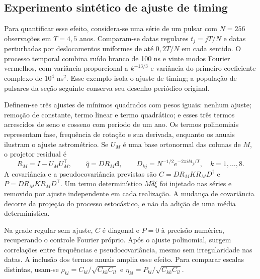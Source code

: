 \subsection{Experimento sintético de ajuste de timing}
\label{sec:timing-sintetico}

Para quantificar esse efeito, considera-se uma série de um pulsar com
$N=256$ observações em $T=4,5$ anos. Comparam-se datas regulares
$t_j=jT/N$ e datas perturbadas por deslocamentos uniformes de até
$0,2T/N$ em cada sentido. O processo temporal combina ruído branco de
100 ns e vinte modos Fourier vermelhos, com variância proporcional a
$k^{-13/3}$ e variância do primeiro coeficiente complexo de
$10^4$ ns$^2$. Esse exemplo isola o ajuste de timing; a população de
pulsares da seção seguinte conserva seu desenho periódico original.

Definem-se três ajustes de mínimos quadrados com pesos iguais: nenhum
ajuste; remoção de constante, termo linear e termo quadrático; e esses
três termos acrescidos de seno e cosseno com período de um ano. Os
termos polinomiais representam fase, frequência de rotação e sua
derivada, enquanto os anuais ilustram o ajuste astrométrico. Se $U_M$
é uma base ortonormal das colunas de $M$, o projetor residual é
\begin{equation}
 R_M=I-U_MU_M^{\mathsf T},\qquad
 \widehat q=D R_M\boldsymbol d,
 \qquad D_{kj}=N^{-1/2}e^{-2\pi i k t_j/T},\quad k=1,\ldots,8.
\end{equation}
A covariância e a pseudocovariância previstas são
$C=D R_M K R_M D^\dagger$ e $P=D R_M K R_M D^{\mathsf T}$.
Um termo determinístico $M\delta\xi$ foi injetado nas séries e removido
por ajuste independente em cada realização. A mudança de covariância
decorre da projeção do processo estocástico, e não da adição de uma
média determinística.

Na grade regular sem ajuste, $C$ é diagonal e $P=0$ à precisão
numérica, recuperando o controle Fourier próprio. Após o ajuste
polinomial, surgem correlações entre frequências e pseudocovariância,
mesmo sem irregularidade nas datas. A inclusão dos termos anuais
amplia esse efeito. Para comparar escalas distintas, usam-se
$\rho_{kl}=C_{kl}/\sqrt{C_{kk}C_{ll}}$ e
$\eta_{kl}=P_{kl}/\sqrt{C_{kk}C_{ll}}$.

\begin{table}[htbp]
\centering
\caption{Dependência entre os oito canais Fourier após o ajuste de
timing. A KL compara a distribuição real conjunta com a aproximação
complexa própria de canais independentes, preservando as variâncias
marginais.}
\label{tab:timing-projecao}

\end{table}

